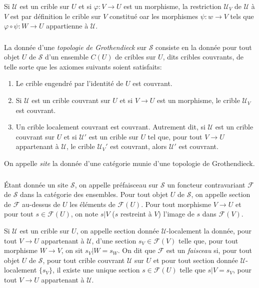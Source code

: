 \documentclass{book}
\newcommand{\cF}{\mathcal{F}}
\newcommand{\sS}{\mathscr{S}}
\newcommand{\sU}{\mathscr{U}}
\begin{document}
Si $\sU$ est un crible sur $U$ et si $\varphi:V\to U$ est un morphisme, la 
restriction $\sU_V$ de $\sU$ à $V$ est par définition le crible sur $V$ 
constitué oar les morphismes $\psi:w\to V$ tels que 
$\varphi\circ\psi:W\to U$ appartienne à $\sU$.





\subsubsection{}\label{I:1-6-2}

La donnée d'une \emph{topologie de Grothendieck} sur $\sS$ consiste en la 
donnée pour tout objet $U$ de $\sS$ d'un ensemble $C(U)$ de cribles sur $U$, 
dits cribles couvrants, de telle sorte que les axiomes suivants soient 
satisfaits:
\begin{enumerate}[\indent a)]
  \item Le crible engendré par l'identité de $U$ est couvrant.
  \item Si $\sU$ est un crible couvrant sur $U$ et si $V\to U$ est un 
    morphisme, le crible $\sU_V$ est couvrant.
  \item Un crible localement couvrant est couvrant. Autrement dit, si $\sU$ est 
    un crible couvrant sur $U$ et si $\sU'$ est un crible sur $U$ tel que, pour 
    tout $V\to U$ appartenant à $\sU$, le crible $\sU_V'$ est couvrant, alors 
    $\sU'$ est couvrant.
\end{enumerate}

On appelle \emph{site} la donnée d'une catégorie munie d'une topologie de 
Grothendieck.





\subsubsection{}\label{I:1-6-3}

Étant donnée un site $\sS$, on appelle préfaisceau sur $\sS$ un foncteur 
contravariant $\cF$ de $\sS$ dans la catégorie des ensembles. Pour tout 
objet $U$ de $\sS$, on appelle section de $\cF$ au-dessus de $U$ les 
éléments de $\cF(U)$. Pour tout morphisme $V\to U$ et pour tout 
$s\in \cF(U)$, on note $s|V$ ($s$ restreint à $V$) l'image de $s$ dans 
$\cF(V)$.

Si $\sU$ est un crible sur $U$, on appelle section donnée $\sU$-localement la 
donnée, pour tout $V\to U$ appartenant à $\sU$, d'une section 
$s_V\in\cF(V)$ telle que, pour tout morphisme $W\to V$, on sit $s_V|W=s_W$. On 
dit que $\cF$ est un \emph{faisceau} si, pour tout objet $U$ de $\sS$, pour 
tout crible couvrant $\sU$ sur $U$ et pour tout section donnée 
$\sU$-localement $\{s_V\}$, il existe une unique section $s\in\cF(U)$ telle que 
$s|V=s_V$, pour tout $V\to U$ appartenant à $\sU$. 
\end{document}
